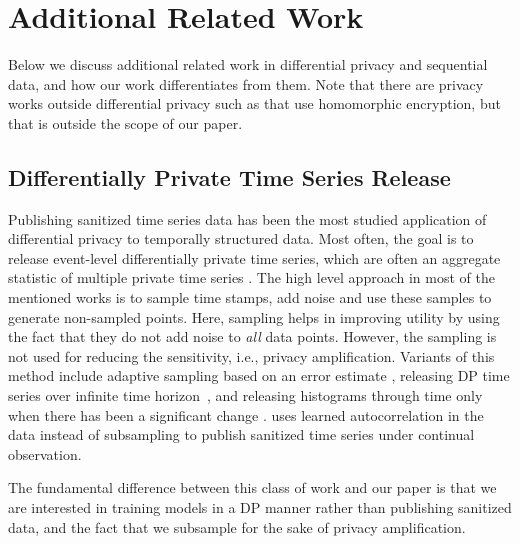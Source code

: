 \section{Additional Related Work}\label{sec:additional-related-work}

Below we discuss additional related work in differential privacy and sequential data, and how our work differentiates from them. Note that there are privacy works outside differential privacy such as \cite{falcetta2022privacy,yue2021privacy, shi2011privacy} that use homomorphic encryption, but that is outside the scope of our paper. %

\subsection{Differentially Private Time Series Release}

Publishing sanitized time series data has been the most studied application of differential privacy to temporally structured data. Most often,  the goal is to release event-level differentially private time series, which are often an aggregate statistic of multiple private time series \cite{shi2011privacy,fan2014adaptive, wang2016rescuedp, wang2020towards, zhang2017dpoctor, fioretto2019optstream, kellaris2014differentially, mao2024differential,katsomallos2019privacy}. The high level approach in most of the mentioned works is to sample time stamps, add noise and use these samples to generate non-sampled points. 
Here, sampling helps in improving utility by using the fact that they do not add noise to \emph{all} data points. However, the sampling is not used for reducing the sensitivity, i.e., privacy amplification.  Variants of this method include adaptive sampling based on an error estimate \cite{fan2014adaptive}, releasing DP time series over infinite time horizon~\cite{kellaris2014differentially}, and releasing histograms through time only when there has been a significant change \cite{li2015differentially}.
\citet{zhang2022differentially} uses learned autocorrelation in the data instead of subsampling to publish sanitized time series under continual observation. 

The fundamental difference between this class of work and our paper is that we are interested in training models in a DP manner rather than publishing sanitized data, and the fact that we subsample for the sake of privacy amplification.



